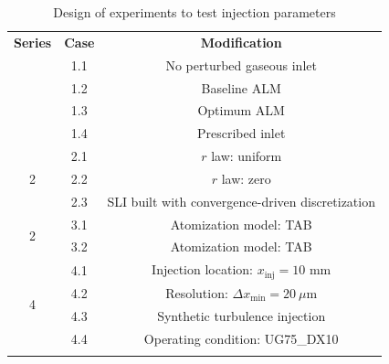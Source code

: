 \begin{table}[!h]
\centering
\caption{Design of experiments to test injection parameters}
\begin{tabular}{ccc}
\thickhline
\textbf{Series} & \textbf{Case} & \textbf{Modification} \\
\thickhline
\multirow{4}{*}{ 1} & 1.1 & No perturbed gaseous inlet \\
& 1.2 & Baseline ALM \\
& 1.3 & Optimum ALM \\
& 1.4 & Prescribed inlet \\
\hline
\multirow{3}{*}{ 2} & 2.1 & $r$ law: uniform \\
& 2.2 & $r$ law: zero \\
& 2.3 & SLI built with convergence-driven discretization \\
\hline
\multirow{2}{*}{ 2} & 3.1 & Atomization model: TAB \\
& 3.2 & Atomization model: TAB \\
\hline
\multirow{4}{*}{ 4} & 4.1 & Injection location: $x_\mathrm{inj} = 10$ mm \\
& 4.2 & Resolution: $\Delta x_\mathrm{min} = 20~\mu$m \\
& 4.3 & Synthetic turbulence injection \\
& 4.4 & Operating condition: UG75\_DX10 \\
\thickhline
\end{tabular}
\label{tab:lgs_jicf_DoF_simple}
\end{table}

\clearpage

